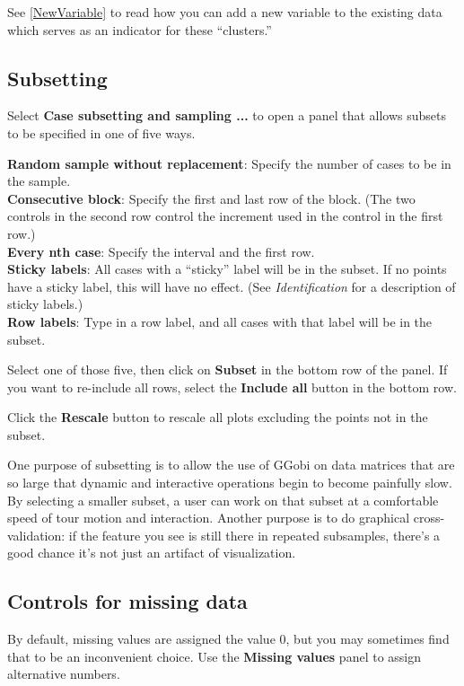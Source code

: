 \documentclass[11pt]{article}
\begin{document}
See \ref{NewVariable} to read how you can add a new variable to the
existing data which serves as an indicator for these ``clusters.''

\subsection{Subsetting}

Select {\bf Case subsetting and sampling ...} to open a panel
that allows subsets to be specified in one of five ways.

{\bf Random sample without replacement}:  Specify the number of
     cases to be in the sample.
\\{\bf Consecutive block}:  Specify the first and last row of the block.
     (The two controls in the second row control the increment used
     in the control in the first row.)
\\{\bf Every nth case}:  Specify the interval and the first row.
\\{\bf Sticky labels}:  All cases with a ``sticky'' label will
  be in the subset.  If no points have a sticky label, this
  will have no effect. (See {\em Identification} for a description
  of sticky labels.)
\\{\bf Row labels}: Type in a row label, and all cases with that
  label will be in the subset.

Select one of those five, then click on {\bf Subset} in the
bottom row of the panel.  If you want to re-include all rows, 
select the {\bf Include all} button in the bottom row.

Click the {\bf Rescale} button to rescale all plots excluding
the points not in the subset.

One purpose of subsetting is to allow the use of GGobi on data matrices
that are so large that dynamic and interactive operations begin to
become painfully slow.  By selecting a smaller subset, a user can
work on that subset at a comfortable speed of tour motion and
interaction.  Another purpose is to do graphical cross-validation:
if the feature you see is still there in repeated subsamples, there's
a good chance it's not just an artifact of visualization.

\subsection{Controls for missing data}
%
By default, missing values are assigned the value $0$, but you
may sometimes find that to be an inconvenient choice.  Use the
{\bf Missing values} panel to assign alternative numbers.
\end{document}
